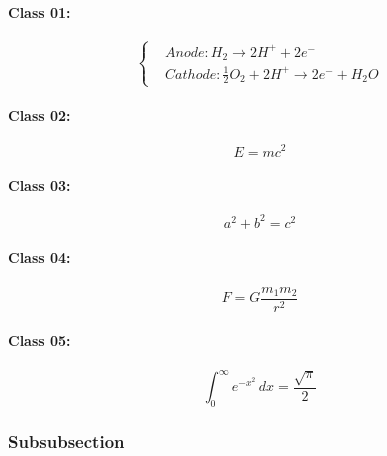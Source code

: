 		
			\paragraph{Class 01:}
		\lipsum[1]
			\begin{equation}
				\label{Eq1.1} 
			\left\{
			\begin{aligned}
				& Anode: H_{2} \to 2H^{+} + 2e^{-}\\
				&Cathode: \frac{1}{2}O_{2} +2H^{+} \to 2e^{-} + H_{2}O
			\end{aligned}
		    \right.
			\end{equation} 

			\paragraph{Class 02:}
				\lipsum[1] 
				\begin{equation}
					\label{Eq1.2}
					E = mc^2
				\end{equation}
				
			\paragraph{Class 03:}
					\lipsum[1] 
				\begin{equation}
					\label{Eq1.3}
					a^2 + b^2 = c^2
					\end{equation}
					
			\paragraph{Class 04:}
					\lipsum[1]	
				\begin{equation}
					\label{Eq1.4}
					F = G \frac{m_1 m_2}{r^2}
				\end{equation}
				
			\paragraph{Class 05:}
					\lipsum[1]
			 
		
					\begin{equation}
						\label{Eq1.5}
						\int_{0}^{\infty} e^{-x^2} \, dx = \frac{\sqrt{\pi}}{2}
					\end{equation}

			
		\subsubsection{Subsubsection} 
	
